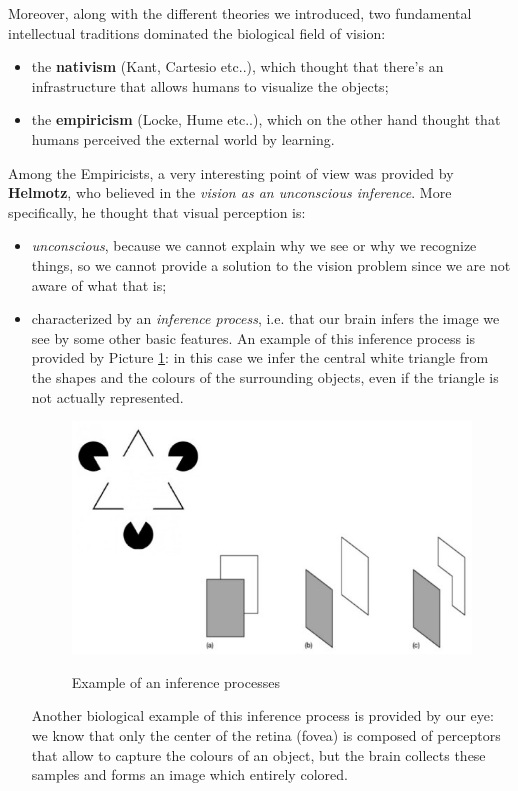 Moreover, along with the different theories we introduced, two fundamental intellectual traditions dominated the biological field of vision:

\begin{itemize}
    \item the \textbf{nativism} (Kant, Cartesio etc..), which thought that there's an infrastructure that allows humans to visualize the objects;
    \item the \textbf{empiricism} (Locke, Hume etc..), which on the other hand thought that humans perceived the external world by learning.
\end{itemize}

Among the Empiricists, a very interesting point of view was provided by \textbf{Helmotz}, who believed in the \textit{vision as an unconscious inference}. More specifically, he thought that visual perception is:

\begin{itemize}
    \item \textit{unconscious}, because we cannot explain why we see or why we recognize things, so we cannot provide a solution to the vision problem since we are not aware of what that is;
    \item characterized by an \textit{inference process}, i.e. that our brain infers the image we see by some other basic features. An example of this inference process is provided by Picture \ref{inference}: in this case we infer the central white triangle from the shapes and the colours of the surrounding objects, even if the triangle is not actually represented.

    \begin{figure}[h!]
		\centering
		\includegraphics[scale = 1.5]{img/inference.jpg}
		\label{inference}
		\caption{Example of an inference processes}
    \end{figure}

    Another biological example of this inference process is provided by our eye: we know that only the center of the retina (fovea) is composed of perceptors that allow to capture the colours of an object, but the brain collects these samples and forms an image which entirely colored.
    
\end{itemize}


